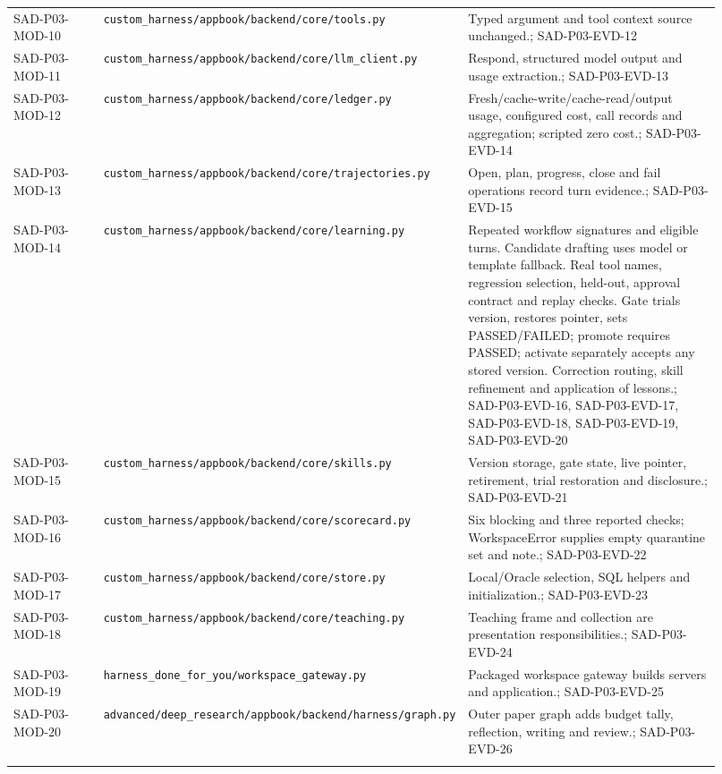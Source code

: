\documentclass[10pt,letterpaper]{article}
\begin{document}
\begin{longtable}{@{}>{\raggedright\arraybackslash}p{0.15\linewidth}>{\raggedright\arraybackslash}p{0.34\linewidth}>{\raggedright\arraybackslash}p{0.43\linewidth}@{}}
SAD-P03-MOD-10 & \nolinkurl{custom_harness/appbook/backend/core/tools.py} & Typed argument and tool context source unchanged.; SAD-P03-EVD-12\\\addlinespace
SAD-P03-MOD-11 & \nolinkurl{custom_harness/appbook/backend/core/llm_client.py} & Respond, structured model output and usage extraction.; SAD-P03-EVD-13\\\addlinespace
SAD-P03-MOD-12 & \nolinkurl{custom_harness/appbook/backend/core/ledger.py} & Fresh/cache-write/cache-read/output usage, configured cost, call records and aggregation; scripted zero cost.; SAD-P03-EVD-14\\\addlinespace
SAD-P03-MOD-13 & \nolinkurl{custom_harness/appbook/backend/core/trajectories.py} & Open, plan, progress, close and fail operations record turn evidence.; SAD-P03-EVD-15\\\addlinespace
SAD-P03-MOD-14 & \nolinkurl{custom_harness/appbook/backend/core/learning.py} & Repeated workflow signatures and eligible turns. Candidate drafting uses model or template fallback. Real tool names, regression selection, held-out, approval contract and replay checks. Gate trials version, restores pointer, sets PASSED/FAILED; promote requires PASSED; activate separately accepts any stored version. Correction routing, skill refinement and application of lessons.; SAD-P03-EVD-16, SAD-P03-EVD-17, SAD-P03-EVD-18, SAD-P03-EVD-19, SAD-P03-EVD-20\\\addlinespace
SAD-P03-MOD-15 & \nolinkurl{custom_harness/appbook/backend/core/skills.py} & Version storage, gate state, live pointer, retirement, trial restoration and disclosure.; SAD-P03-EVD-21\\\addlinespace
SAD-P03-MOD-16 & \nolinkurl{custom_harness/appbook/backend/core/scorecard.py} & Six blocking and three reported checks; WorkspaceError supplies empty quarantine set and note.; SAD-P03-EVD-22\\\addlinespace
SAD-P03-MOD-17 & \nolinkurl{custom_harness/appbook/backend/core/store.py} & Local/Oracle selection, SQL helpers and initialization.; SAD-P03-EVD-23\\\addlinespace
SAD-P03-MOD-18 & \nolinkurl{custom_harness/appbook/backend/core/teaching.py} & Teaching frame and collection are presentation responsibilities.; SAD-P03-EVD-24\\\addlinespace
SAD-P03-MOD-19 & \nolinkurl{harness_done_for_you/workspace_gateway.py} & Packaged workspace gateway builds servers and application.; SAD-P03-EVD-25\\\addlinespace
SAD-P03-MOD-20 & \nolinkurl{advanced/deep_research/appbook/backend/harness/graph.py} & Outer paper graph adds budget tally, reflection, writing and review.; SAD-P03-EVD-26\\\addlinespace

\end{longtable}
\end{document}
